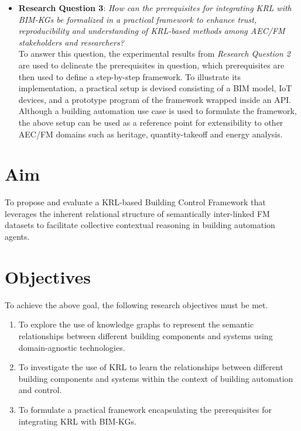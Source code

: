 \begin{itemize}
    \item
    \textbf{Research Question 3}: \emph{How can the prerequisites for integrating \ac{KRL} with \acp{BIM-KG} be formalized in a practical framework to enhance trust, reproducibility and understanding of KRL-based methods among AEC/FM stakeholders and researchers?} \\

    To answer this question, the experimental results from \textit{Research Question 2} are used to delineate the prerequisites in question, which prerequisites are then used to define a step-by-step framework. To illustrate its implementation, a practical setup is devised consisting of a \ac{BIM} model, \ac{IoT} devices, and a prototype program of the framework wrapped inside an \ac{API}. Although a building automation use case is used to formulate the framework, the above setup can be used as a reference point for extensibility to other \ac{AEC/FM} domains such as heritage, quantity-takeoff and energy analysis.   
\end{itemize}

\section{Aim}
To propose and evaluate a \ac{KRL}-based Building Control Framework that leverages the inherent relational structure of semantically inter-linked \ac{FM} datasets to facilitate collective contextual reasoning in building automation agents.

\section{Objectives}
To achieve the above goal, the following research objectives must be met.

\begin{enumerate}

	\item
	To explore the use of knowledge graphs to represent the semantic relationships between different building components and systems using domain-agnostic technologies.
 
	\item 
	To investigate the use of \ac{KRL} to learn the relationships between different building components and systems within the context of building automation and control.
 
        \item
    To formulate a practical framework encapsulating the prerequisites for integrating \ac{KRL} with \acp{BIM-KG}.
\end{enumerate}

